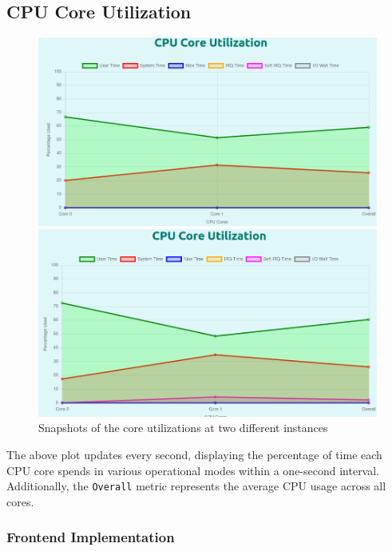 \documentclass[12pt]{article}
\begin{document}
\subsection{CPU Core Utilization}
\begin{figure}[H]
    \centering
    \begin{minipage}{0.45\textwidth}
        \centering
        \includegraphics[width=\textwidth]{logos and images/HTOP_1.png}
    \end{minipage}
    \hfill
    \begin{minipage}{0.45\textwidth}
        \centering
        \includegraphics[width=\textwidth]{logos and images/HTOP_2.png}
    \end{minipage}
    \caption{Snapshots of the core utilizations at two different instances}
\end{figure}
The above plot updates every second, displaying the percentage of time each CPU core spends in various operational modes within a one-second interval. Additionally, the \texttt{Overall} metric represents the average CPU usage across all cores.
\subsubsection{Frontend Implementation}
\end{document}
